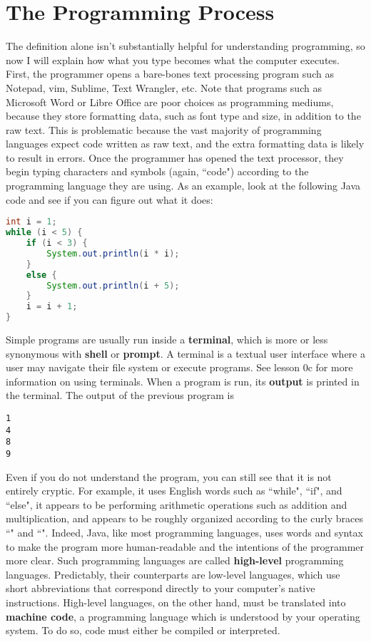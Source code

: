 \documentclass{article}
\begin{document}
\section*{The Programming Process}
The definition alone isn't substantially helpful for understanding programming, so now I will explain how what you type
becomes what the computer executes. First, the programmer opens a bare-bones text processing program such as Notepad, 
vim, Sublime, Text Wrangler, etc. Note that programs such as Microsoft Word or Libre Office are poor choices as 
programming mediums, because they store formatting data, such as font type and size, in addition to the raw text. This
is problematic because the vast majority of programming languages expect code written as raw text, and the extra
formatting data is likely to result in errors. Once the programmer has opened the text processor, they begin typing 
characters and symbols (again, ``code") according to the programming language they are using. As an example, look at the
following Java code and see if you can figure out what it does:
\clearpage
\begin{lstlisting}[language=Java]
int i = 1;
while (i < 5) {
    if (i < 3) {
        System.out.println(i * i);
    }
    else {
        System.out.println(i + 5);
    }
    i = i + 1;
}
\end{lstlisting}
Simple programs are usually run inside a \textbf{terminal}, which is more or less synonymous with \textbf{shell} or 
\textbf{prompt}. A terminal is a textual user interface where a user may navigate their file system or execute programs.
See lesson 0c for more information on using terminals. When a program is run, its \textbf{output} is printed in the
terminal. The output of the previous program is
\begin{lstlisting}
1
4
8
9
\end{lstlisting}
Even if you do not understand the program, you can still see that it is not entirely cryptic. For example, it uses
English words such as ``while", ``if", and ``else", it appears to be performing arithmetic operations such as addition 
and multiplication, and appears to be roughly organized according to the curly braces ``{" and ``}". Indeed, Java, like 
most programming languages, uses words and syntax to make the program more human-readable and the intentions of the
programmer more clear. Such programming languages are called \textbf{high-level} programming languages. Predictably,
their counterparts are {low-level} languages, which use short abbreviations that correspond directly to your
computer's native instructions. High-level languages, on the other hand, must be translated into \textbf{machine code},
a programming language which is understood by your operating system. To do so, code must either be compiled or 
interpreted.
\end{document}
